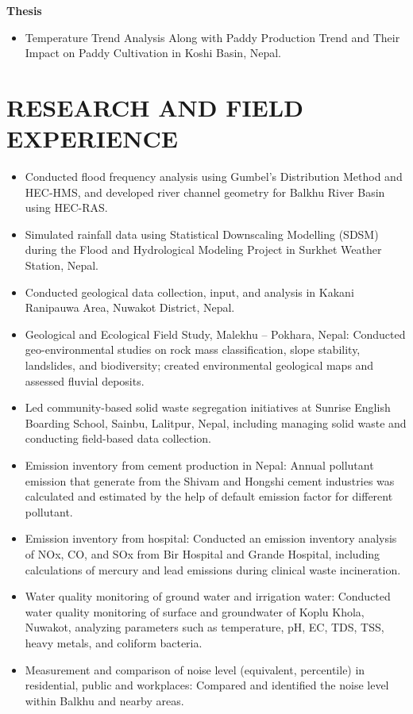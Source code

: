 \documentclass[a4paper, 09pt]{extarticle}
\begin{document}
\noindent
\textbf{Thesis}
\begin{itemize}
    \item Temperature Trend Analysis Along with Paddy Production Trend and Their Impact on Paddy Cultivation in Koshi Basin, Nepal.

\end{itemize}

\section*{RESEARCH AND FIELD EXPERIENCE}
\begin{itemize}
    \item Conducted flood frequency analysis using Gumbel’s Distribution Method and HEC-HMS, and developed river channel geometry for Balkhu River Basin using HEC-RAS.
    \item Simulated rainfall data using Statistical Downscaling Modelling (SDSM) during the Flood and Hydrological Modeling Project in Surkhet Weather Station, Nepal.
    \item Conducted geological data collection, input, and analysis in Kakani Ranipauwa Area, Nuwakot District, Nepal.
    \item Geological and Ecological Field Study, Malekhu – Pokhara, Nepal: Conducted geo-environmental studies on rock mass classification, slope stability, landslides, and biodiversity; created environmental geological maps and assessed fluvial deposits.
    \item Led community-based solid waste segregation initiatives at Sunrise English Boarding School, Sainbu, Lalitpur, Nepal, including managing solid waste and conducting field-based data collection.
    \item Emission inventory from cement production in Nepal:  Annual pollutant emission that generate from the Shivam and Hongshi cement industries was calculated and estimated by the help of default emission factor for different pollutant.
    \item Emission inventory from hospital: Conducted an emission inventory analysis of NOx, CO, and SOx from Bir Hospital and Grande Hospital, including calculations of mercury and lead emissions during clinical waste incineration.
    \item Water quality monitoring of ground water and irrigation water: Conducted water quality monitoring of surface and groundwater of Koplu Khola, Nuwakot, analyzing parameters such as temperature, pH, EC, TDS, TSS, heavy metals, and coliform bacteria.
    \item Measurement and comparison of noise level (equivalent, percentile) in residential, public and workplaces: Compared and identified the noise level within Balkhu and nearby areas.
\end{itemize}
\end{document}
